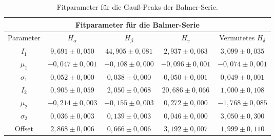 \begin{table}[H]
\centering
{}
\caption{Spektrallinien der H/Deuterium-Lampe in erster Ordnung. Hierbei ist $d$ die Dicke der Spektrallinien (in Strichpunkten), $\omega_B$ der Winkel der Blende und $\omega_G$ der Beugungswinkel.}
\label{tab:H_D_lines}
\end{table}

\begin{table}[H]
  \centering
  \caption{Fitparameter für die Gauß-Peaks der Balmer-Serie.}
  \label{tab:Peaks}
  \begin{tabular}{|c|c|c|c|c|}
    \hline
    \multicolumn{5}{|c|}{Fitparameter für die Balmer-Serie} \\ \hline
    Parameter    & $H_\alpha$               & $H_\beta$                & $H_\gamma$               & Vermutetes $H_\delta$     \\ \hline
    $I_1$        & $9{,}691 \pm 0{,}050$     & $44{,}905 \pm 0{,}081$    & $2{,}937 \pm 0{,}063$     & $3{,}099 \pm 0{,}035$      \\ \hline
    $\mu_1$      & $-0{,}047 \pm 0{,}001$    & $-0{,}108 \pm 0{,}000$    & $-0{,}096 \pm 0{,}001$    & $-0{,}074 \pm 0{,}001$     \\ \hline
    $\sigma_1$   & $0{,}052 \pm 0{,}000$     & $0{,}038 \pm 0{,}000$     & $0{,}050 \pm 0{,}001$     & $0{,}049 \pm 0{,}001$      \\ \hline
    $I_2$        & $0{,}905 \pm 0{,}059$     & $2{,}050 \pm 0{,}068$     & $20{,}686 \pm 0{,}066$    & $1{,}000 \pm 0{,}108$      \\ \hline
    $\mu_2$      & $-0{,}214 \pm 0{,}003$    & $-0{,}155 \pm 0{,}003$    & $0{,}272 \pm 0{,}000$     & $-1{,}768 \pm 0{,}085$     \\ \hline
    $\sigma_2$   & $0{,}036 \pm 0{,}003$     & $0{,}139 \pm 0{,}003$     & $0{,}046 \pm 0{,}000$     & $3{,}050 \pm 0{,}300$      \\ \hline
    Offset       & $2{,}868 \pm 0{,}006$     & $0{,}666 \pm 0{,}006$     & $3{,}192 \pm 0{,}007$     & $1{,}999 \pm 0{,}110$      \\ \hline
  \end{tabular}
\end{table}